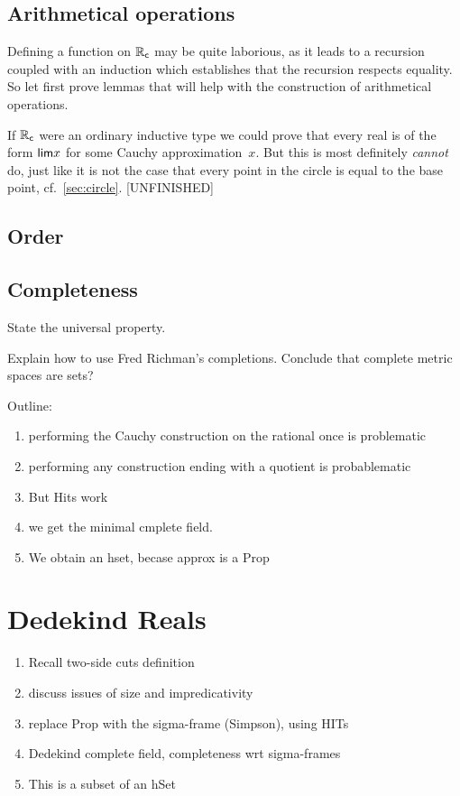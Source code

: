 \subsection{Arithmetical operations}
\label{sec:arithm-oper}

Defining a function on $\mathbb{R}_\mathsf{c}$ may be quite laborious, as it leads to a recursion coupled
with an induction which establishes that the recursion respects equality. So let first
prove lemmas that will help with the construction of arithmetical operations.

If $\mathbb{R}_\mathsf{c}$ were an ordinary inductive type we could prove that every real is of the form
$\mathsf{lim}{x}$ for some Cauchy approximation~$x$. But this is most definitely \emph{cannot}
do, just like it is not the case that every point in the circle is equal to the base
point, cf.\ \autoref{sec:circle}. [UNFINISHED]

\subsection{Order}
\label{sec:order}

\subsection{Completeness}
\label{sec:completeness}

State the universal property.

Explain how to use Fred Richman's completions. Conclude that complete metric spaces are sets?




\hrulefill

Outline:
\begin{enumerate}
  \item performing the Cauchy construction on the rational once is problematic
  \item performing any construction ending with a quotient is probablematic
  \item But Hits work
  \item we get the minimal cmplete field.
  \item We obtain an hset, becase approx is a Prop
\end{enumerate}

\section{Dedekind Reals}
\label{sec:dedekind-reals}

\begin{enumerate}
\item Recall two-side cuts definition
\item discuss issues of size and impredicativity
\item replace Prop with the sigma-frame (Simpson), using HITs
\item Dedekind complete field, completeness wrt sigma-frames
\item This is a subset of an hSet
\end{enumerate}

